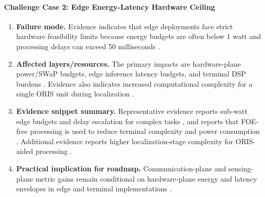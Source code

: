 \paragraph{Challenge Case 2: Edge Energy-Latency Hardware Ceiling}
\begin{enumerate}
    \item \textbf{Failure mode.} Evidence indicates that edge deployments face strict hardware feasibility limits because energy budgets are often below 1 watt and processing delays can exceed 50 milliseconds \cite{O_ISAC_093}.
    \item \textbf{Affected layers/resources.} The primary impacts are hardware-plane power/SWaP budgets, edge inference latency budgets, and terminal DSP burdens \cite{O_ISAC_093, O_ISAC_095}. Evidence also indicates increased computational complexity for a single ORIS unit during localization \cite{O_ISAC_112}.
    \item \textbf{Evidence snippet summary.} Representative evidence reports sub-watt edge budgets and delay escalation for complex tasks \cite{O_ISAC_093}, and reports that FOE-free processing is used to reduce terminal complexity and power consumption \cite{O_ISAC_095}. Additional evidence reports higher localization-stage complexity for ORIS-aided processing \cite{O_ISAC_112}.
    \item \textbf{Practical implication for roadmap.} Communication-plane and sensing-plane metric gains remain conditional on hardware-plane energy and latency envelopes in edge and terminal implementations \cite{O_ISAC_093, O_ISAC_095, O_ISAC_112}.
\end{enumerate}

